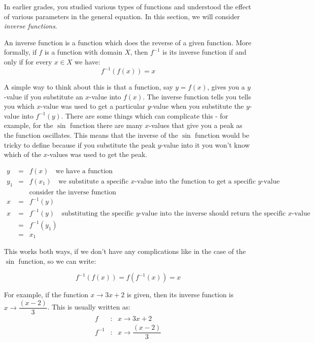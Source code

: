 In earlier grades, you studied various types of functions and understood the effect of various parameters in the general equation. In this section, we will consider \textit{inverse functions}.

An inverse function is a function which does the reverse of a given function. More formally, if $f$ is a function with domain $X$, then $f^{-1}$ is its inverse function if and only if for every $x \in X$ we have:
\begin{equation}
f^{-1}(f(x))=x
\end{equation}

A simple way to think about this is that a function, say $y=f(x)$, gives you a $y$-value if you substitute an $x$-value into $f(x)$. The inverse function tells you tells you which $x$-value was used to get a particular $y$-value when you substitute the $y$-value into $f^{-1}(y)$. There are some things which can complicate this - for example, for the $\sin$ function there are many $x$-values that give you a peak as the function oscillates. This means that the inverse of the $\sin$ function would be tricky to define because if you substitute the peak $y$-value into it you won't know which of the $x$-values was used to get the peak.

\begin{eqnarray*}
 y&=&f(x) \quad \mbox{we have a function} \\
 y_1 &=& f(x_1) \quad \mbox{we substitute a specific $x$-value into the function to get a specific $y$-value}\\
 &&\mbox{consider the inverse function}\\
 x&=&f^{-1}(y)\\
 x&=&f^{-1}(y)\quad\mbox{substituting the specific $y$-value into the inverse should return the specific $x$-value}\\
 &=&f^{-1}(y_1)\\
  &=&x_1
\end{eqnarray*}

This works both ways, if we don't have any complications like in the case of the $\sin$ function, so we can write:

\begin{equation}
f^{-1}(f(x))=f(f^{-1}(x))=x
\end{equation}

For example, if the function $x \rightarrow 3x + 2$ is given, then its inverse function is $x \rightarrow \dfrac{(x-2)}{3}$. This is usually written as:
\begin{eqnarray}
f &\colon& x \to 3x+2\\
f^{-1} &\colon& x \to \dfrac{(x-2)}{3}
\end{eqnarray}

